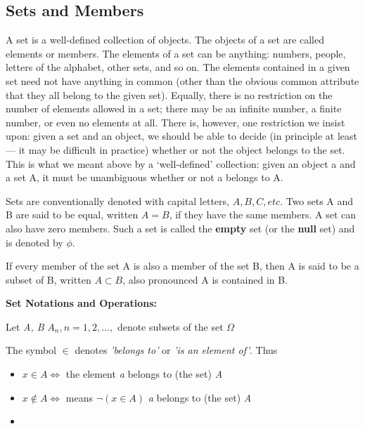 \documentclass[12pt]{article}
\begin{document}
\subsection{Sets and Members}
A set is a well-defined collection of objects. The objects of a set are called elements or members. The elements of a set can be anything: numbers, people, letters of the alphabet, other sets, and so on. The elements contained in a given set need not have anything in common (other than the obvious common attribute that they all belong to the given set). Equally, there is no restriction on the number of elements allowed in a set; there may be an infinite number, a finite number, or even no elements
at all. There is, however, one restriction we insist upon: given a set and an object, we should be able to decide (in principle at least — it may be difficult in practice) whether or not the object belongs to the set. This is what we meant above by a ‘well-defined’ collection: given an object a and a set A, it must be unambiguous whether or not a belongs to A.

Sets are conventionally denoted with capital letters, $A, B, C, etc$. Two sets A and B are said to be equal, written $A=B$, if they have the same members. A set can also have zero members. Such a set is called the \textbf{empty} set (or the \textbf{null} set) and is denoted by $\phi$.

If every member of the set A is also a member of the set B, then A is said to be a subset of B, written $A \subset B$, also pronounced A is contained in B.

\textbf{Set Notations and Operations:}

Let \textit{A, B} $A_n, n=1,2,...,$ denote subsets of the set $\Omega$

The symbol $\in$ denotes \textit{'belongs to'} or \textit{'is an element of'}. Thus

\begin{itemize}
	\item $x \in A \Longleftrightarrow$ the element \textit{a} belongs to (the set) \textit{A}
	
	\item $x \notin A \Longleftrightarrow$ means $\neg(x \in A)$ \textit{a} belongs to (the set) \textit{A}
\end{itemize}

\begin{itemize}
	\item 
\end{itemize}
\end{document}
